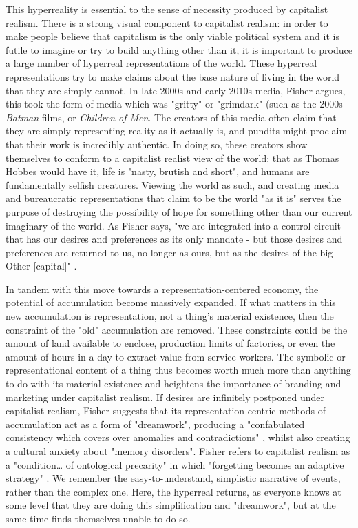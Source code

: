 This hyperreality is essential to the sense of necessity produced by capitalist realism. There is a strong visual component to capitalist realism: in order to make people believe that capitalism is the only viable political system and it is futile to imagine or try to build anything other than it, it is important to produce a large number of hyperreal representations of the world. These hyperreal representations try to make claims about the base nature of living in the world that they are simply cannot. In late 2000s and early 2010s media, Fisher argues, this took the form of media which was "gritty" or "grimdark" (such as the 2000s \textit{Batman} films, or \emph{Children of Men}. The creators of this media often claim that they are simply representing reality as it actually is, and pundits might proclaim that their work is incredibly authentic. In doing so, these creators show themselves to conform to a capitalist realist view of the world: that as Thomas Hobbes would have it, life is "nasty, brutish and short", and humans are fundamentally selfish creatures. Viewing the world as such, and creating media and bureaucratic representations that claim to be the world "as it is" serves the purpose of destroying the possibility of hope for something other than our current imaginary of the world. As Fisher says, "we are integrated into a control circuit that has our desires and preferences as its only mandate - but those desires and preferences are returned to us, no longer as ours, but as the desires of the big Other [capital]" \citeyearpar[p. 53]{fisher_capitalist_2009}.

In tandem with this move towards a representation-centered economy, the potential  of accumulation become massively expanded. If what matters in this new accumulation is representation, not a thing's material existence, then the constraint of the "old" accumulation are removed. These constraints could be the amount of land available to enclose, production limits of factories, or even the amount of hours in a day to extract value from service workers. The symbolic or representational content of a thing thus becomes worth much more than anything to do with its material existence and heightens the importance of branding and marketing under capitalist realism. If desires are infinitely postponed under capitalist realism, Fisher suggests that its representation-centric methods of accumulation act as a form of "dreamwork", producing a "confabulated consistency which covers over anomalies and contradictions" \citep[p. 64]{fisher_capitalist_2009}, whilst also creating a cultural anxiety about "memory disorders". Fisher refers to capitalist realism as a "condition\ldots{} of ontological precarity" in which "forgetting becomes an adaptive strategy" \citep[p. 60]{fisher_capitalist_2009}. We remember the easy-to-understand, simplistic narrative of events, rather than the complex one.  Here, the hyperreal returns, as everyone knows at some level that they are doing this simplification and "dreamwork", but at the same time finds themselves unable to do so.

